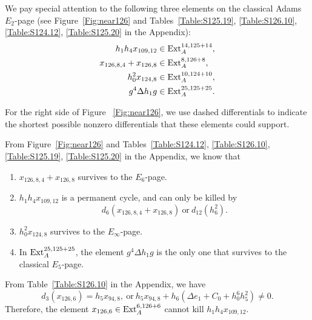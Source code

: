 \documentclass{amsart}
\numberwithin{equation}{section}
\begin{document}
We pay special attention to the following three elements on the classical Adams $E_2$-page (see Figure~\ref{Fig:near126} and Tables~\ref{Table:S125.19}, \ref{Table:S126.10}, \ref{Table:S124.12}, \ref{Table:S125.20} in the Appendix): 
\begin{align*}
    h_1h_4x_{109,12} & \in \mathrm{Ext}_A^{14, 125+14}, \\
    x_{126,8,4} + x_{126,8} & \in \mathrm{Ext}_A^{8, 126+8}, \\
    h_0^2x_{124,8} & \in \mathrm{Ext}_A^{10, 124+10},\\
    g^4\Delta h_1g & \in \mathrm{Ext}_A^{25,125+25}.
\end{align*}

For the right side of Figure ~\ref{Fig:near126}, we use dashed differentials to indicate the shortest possible nonzero differentials that these elements could support.

{

}

From Figure~\ref{Fig:near126} and Tables~\ref{Table:S124.12}, \ref{Table:S126.10}, \ref{Table:S125.19}, \ref{Table:S125.20} in the Appendix, we know that
\begin{fact} \label{fact:theta5sqAF}
\begin{enumerate}
    \item $x_{126,8,4} + x_{126,8}$ survives to the $E_6$-page.
    
    \item $h_1h_4x_{109,12}$ is a permanent cycle, and can only be killed by 
    $$d_6(x_{126,8,4} + x_{126,8}) \ \text{or} \ d_{12}(h_6^2).$$
    
    \item $h_0^2x_{124,8}$ survives to the $E_\infty$-page.

    \item In $\mathrm{Ext}_A^{25,125+25}$, the element $g^4\Delta h_1g$ is the only one that survives to the classical $E_5$-page.
\end{enumerate}\end{fact}

\begin{remark}
From Table~\ref{Table:S126.10} in the Appendix, we have
   $$d_3(x_{126,6}) = h_5x_{94,8}, \ \text{or} \ h_5x_{94,8} + h_6(\Delta e_1 + C_0 + h_0^6h_5^2) \neq 0.$$
   Therefore, the element $x_{126,6} \in \mathrm{Ext}_A^{6, 126+6}$ cannot kill $h_1h_4x_{109,12}$.
\end{remark}
\end{document}
